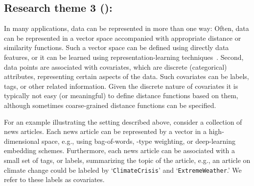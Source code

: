 \documentclass[a4paper,11pt]{article}
\begin{document}


\subsection*{Research theme 3 (\rth): \covariates}

In many applications, data can be represented in more than one way: 
Often, data can be represented in a vector space
accompanied with appropriate distance or similarity functions.
Such a vector space can be defined using directly data features, 
or it can be learned using representation-learning techniques~\cite{hamilton2017representation,wang2020survey}.
Second, data points are associated with covariates, 
which are discrete (categorical) attributes, 
representing certain aspects of the data. 
Such covariates can be labels, tags, or other related information.
Given the discrete nature of covariates it is typically not easy (or meaningful)
to define distance functions based on them, 
although sometimes coarse-grained distance functions can be specified.

For an example illustrating the setting described above, 
consider a collection of news articles. 
Each news article can be represented by a vector in a high-dimensional space, 
e.g., using bag-of-words, \tfidf-type weighting, or deep-learning embedding schemes. 
Furthermore, each news article can be associated with a small 
set of tags, or labels, summarizing the topic of the article, 
e.g., an article on climate change could be labeled by
`\texttt{\small ClimateCrisis}' and `\texttt{\small ExtremeWeather}.'
We refer to these labels as covariates.
\end{document}
